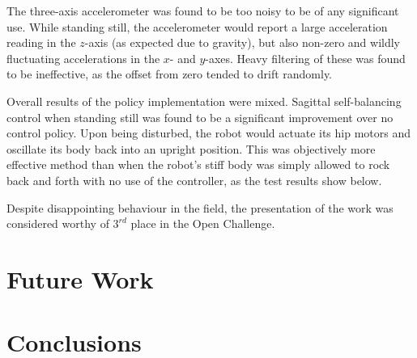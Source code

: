 The three-axis accelerometer was found to be too noisy to be of any significant use. While standing still, the accelerometer would report a large acceleration reading in the $z$-axis (as expected due to gravity), but also non-zero and wildly fluctuating accelerations in the $x$- and $y$-axes. Heavy filtering of these was found to be ineffective, as the offset from zero tended to drift randomly.



Overall results of the policy implementation were mixed. Sagittal self-balancing control when standing still was found to be a significant improvement over no control policy. Upon being disturbed, the robot would actuate its hip motors and oscillate its body back into an upright position. This was objectively more effective method than when the robot's stiff body was simply allowed to rock back and forth with no use of the controller, as the test results show below.



Despite disappointing behaviour in the field, the presentation of the work was considered worthy of $3^{rd}$ place in the Open Challenge.


\section{Future Work}


\section{Conclusions}
